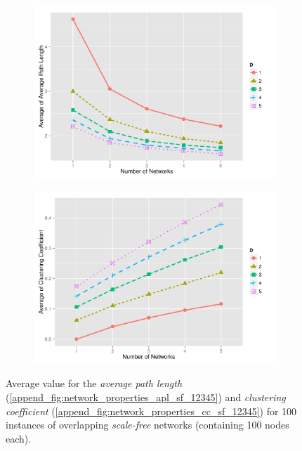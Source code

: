 \documentclass[preprint,number]{elsarticle}
\begin{document}
\begin{figure}[H]
	\centering
	\begin{subfigure}{.5\linewidth}
		\centering
		\includegraphics[width=1\linewidth]{"../analysis/pdf/network_properties_apl_line_sf_12345"}
		\caption{}
		\label{fig:network_properties_apl_line_sf_12345}
	\end{subfigure}%
	\begin{subfigure}{.5\linewidth}
		\centering
		\includegraphics[width=1\linewidth]{"../analysis/pdf/network_properties_cc_line_sf_12345"}
		\caption{}
		\label{fig:network_properties_cc_line_sf_12345}
	\end{subfigure}
	\begin{minipage}{0.9\textwidth}
		\vspace{0.2cm}
		\caption{Average value for the \textit{average path length} (\ref{append_fig:network_properties_apl_sf_12345}) and \textit{clustering coefficient} (\ref{append_fig:network_properties_cc_sf_12345}) for 100 instances of overlapping \textit{scale-free} networks (containing 100 nodes each).}
		\label{fig:network_properties_line_sf}
	\end{minipage}
\end{figure}
\end{document}
